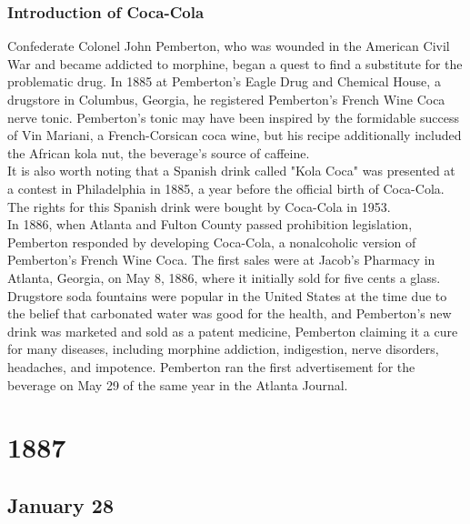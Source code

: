 \documentclass[11pt]{report}
\begin{document}
\subsection{Introduction of Coca-Cola}
Confederate Colonel John Pemberton, who was wounded in the American Civil War and became addicted to morphine, began a quest to find a substitute for the problematic drug. In 1885 at Pemberton's Eagle Drug and Chemical House, a drugstore in Columbus, Georgia, he registered Pemberton's French Wine Coca nerve tonic. Pemberton's tonic may have been inspired by the formidable success of Vin Mariani, a French-Corsican coca wine, but his recipe additionally included the African kola nut, the beverage's source of caffeine.\\ \indent It is also worth noting that a Spanish drink called "Kola Coca" was presented at a contest in Philadelphia in 1885, a year before the official birth of Coca-Cola. The rights for this Spanish drink were bought by Coca-Cola in 1953.\\ \indent In 1886, when Atlanta and Fulton County passed prohibition legislation, Pemberton responded by developing Coca-Cola, a nonalcoholic version of Pemberton's French Wine Coca. The first sales were at Jacob's Pharmacy in Atlanta, Georgia, on May 8, 1886, where it initially sold for five cents a glass. Drugstore soda fountains were popular in the United States at the time due to the belief that carbonated water was good for the health, and Pemberton's new drink was marketed and sold as a patent medicine, Pemberton claiming it a cure for many diseases, including morphine addiction, indigestion, nerve disorders, headaches, and impotence. Pemberton ran the first advertisement for the beverage on May 29 of the same year in the Atlanta Journal.

\chapter{1887}
\section{January 28}
\end{document}
